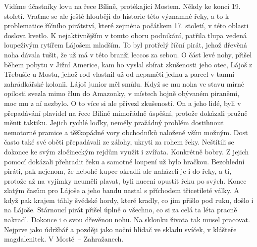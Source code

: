 
Vidíme účastníky lovu na řece Bílině, protékající Mostem. Někdy ke
konci 19. století. Vraťme se ale ještě hlouběji do historie této
významné řeky, a to k problematice říčního pirátství, které zejména
počátkem 17. století, v této oblasti doslova kvetlo. K nejaktivnějším
v tomto oboru podnikání, patřila tlupa vedená loupeživým rytířem
Lájošem mladším. To byl protřelý říční pirát, jehož dřevěná noha
dávala tušit, že už má v této branži leccos za sebou. O část levé
nohy, přišel během pobytu v Jižní Americe, kam ho vyslal sbírat
zkušenosti jeho otec, Lájoš z Třebušic u Mostu, jehož rod vlastnil už
od nepaměti jednu z parcel v tamní zahrádkářské kolonii. Lájoš junior
měl smůlu. Když se mu noha ve stavu mírné opilosti svezla mimo člun do
Amazonky, v místech hojně obývaném piraněmi, moc mu z ní nezbylo. O to
více si ale přivezl zkušeností. On a jeho lidé, byli v přepadávání
plavidel na řece Bílině mimořádně úspěšní, protože dokázali pružně
měnit taktiku. Jejich rychlé loďky, neměly pražádný problém
dostihnout nemotorné pramice a těžkopádné vory obchodníků naložené
vším možným. Dost často také své oběti přepadávali ze zálohy, ukryti
za rohem řeky. Neštítili se dokonce ke svým zločineckým rejdům využít
i zvířata. Konkrétně bobry. Z jejich pomocí dokázali přehradit řeku a
samotné loupení už bylo hračkou. Bezohlední piráti, pak nejenom, že
nebohé kupce okradli ale naházeli je i do řeky, a ti, protože až na
vyjímky neuměli plavat, byli nuceni opustit řeku po svých. Konec
zlatým časům pro Lájoše a jeho bandu nastal s příchodem třicetileté
války. A když pak krajem táhly švédské hordy, které kradly, co jim
přišlo pod ruku, došlo i na Lájoše. Stárnoucí pirát přišel úplně o
všechno, co si za celá ta léta pracně nakradl. Dokonce i o svou
dřevěnou nohu. Na sklonku života tak musel pracovat. Nejprve jako
údržbář a později jako noční hlídač ve skladu svíček, v klášteře
magdalenitek. V Mostě~-- Zahražanech.
